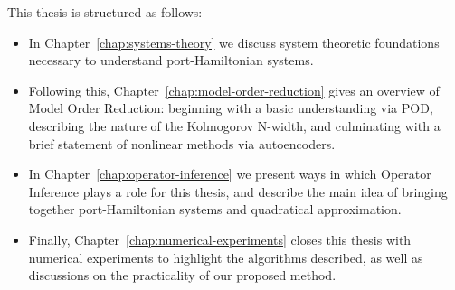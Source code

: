 This thesis is structured as follows:
\begin{itemize}
    \item In Chapter~\ref{chap:systems-theory} we discuss system theoretic foundations necessary to understand port-Hamiltonian systems.
    \item Following this, Chapter~\ref{chap:model-order-reduction} gives an overview of Model Order Reduction: beginning with a basic understanding via POD, describing the nature of the Kolmogorov N-width, and culminating with a brief statement of nonlinear methods via autoencoders.
    \item In Chapter~\ref{chap:operator-inference} we present ways in which Operator Inference plays a role for this thesis, and describe the main idea of bringing together port-Hamiltonian systems and quadratical approximation.
    \item Finally, Chapter~\ref{chap:numerical-experiments} closes this thesis with numerical experiments to highlight the algorithms described, as well as discussions on the practicality of our proposed method.
\end{itemize}
